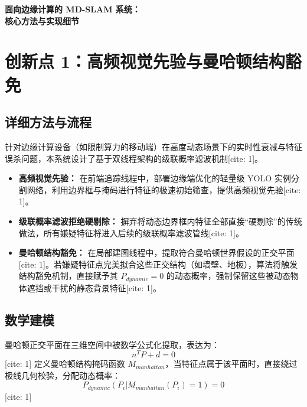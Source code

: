 \documentclass[11pt, a4paper]{ctexart}
\begin{document}
\begin{center}
    {\LARGE \textbf{面向边缘计算的 MD-SLAM 系统：\\ [0.5em] 核心方法与实现细节}} \\ [2em]
\end{center}

\section{创新点 1：高频视觉先验与曼哈顿结构豁免}

\subsection{详细方法与流程}
针对边缘计算设备（如限制算力的移动端）在高度动态场景下的实时性衰减与特征误杀问题，本系统设计了基于双线程架构的级联概率滤波机制[cite: 1]。

\begin{itemize}[label=$\bullet$]
    \item \textbf{高频视觉先验：} 在前端追踪线程中，部署边缘端优化的轻量级 YOLO 实例分割网络，利用边界框与掩码进行特征的极速初始筛查，提供高频视觉先验[cite: 1]。
    \item \textbf{级联概率滤波拒绝硬剔除：} 摒弃将动态边界框内特征全部直接“硬剔除”的传统做法，所有嫌疑特征将进入后续的级联概率滤波管线[cite: 1]。
    \item \textbf{曼哈顿结构豁免：} 在局部建图线程中，提取符合曼哈顿世界假设的正交平面[cite: 1]。若嫌疑特征点完美拟合这些正交结构（如墙壁、地板），算法将触发结构豁免机制，直接赋予其 $P_{dynamic} = 0$ 的动态概率，强制保留这些被动态物体遮挡或干扰的静态背景特征[cite: 1]。
\end{itemize}

\subsection{数学建模}
曼哈顿正交平面在三维空间中被数学公式化提取，表达为：
$$n^T P + d = 0$$[cite: 1]
定义曼哈顿结构掩码函数 $M_{manhattan}$，当特征点属于该平面时，直接绕过极线几何校验，分配动态概率：
$$P_{dynamic}(P_i | M_{manhattan}(P_i) = 1) = 0$$[cite: 1]
\end{document}

